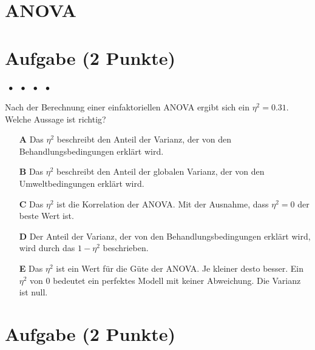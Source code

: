 \documentclass[a4paper, 9pt]{scrartcl}\usepackage[]{graphicx}\usepackage[]{xcolor}
\begin{document}
\section*{ANOVA}

\section{Aufgabe \hfill (2 Punkte)}

\ifcollection
\begin{flushright}
\tiny\vspace{-2Ex}
\textbf{\examinhaltstart}
\exammodulemathstat $\;\bullet$
\exammodulestat $\;\bullet$
\exammodulestatbbv $\;\bullet$
\exammodulestatversuch $\;\bullet$
\exammodulebiostat
\vspace{-1Ex}
\end{flushright}
\fi






Nach der Berechnung einer einfaktoriellen ANOVA ergibt sich ein $\eta^2 = 0.31$. Welche Aussage ist richtig?



\begin{enumerate}
\item [\textbf{A} \msquare] Das $\eta^2$ beschreibt den Anteil der Varianz, der von den Behandlungsbedingungen erklärt wird.
\item [\textbf{B} \msquare] Das $\eta^2$ beschreibt den Anteil der globalen Varianz, der von den Umweltbedingungen erklärt wird.
\item [\textbf{C} \msquare] Das $\eta^2$ ist die Korrelation der ANOVA. Mit der Ausnahme, dass $\eta^2 = 0$ der beste Wert ist.
\item [\textbf{D} \msquare] Der Anteil der Varianz, der von den Behandlungsbedingungen erklärt wird, wird durch das $1-\eta^2$ beschrieben.
\item [\textbf{E} \msquare] Das $\eta^2$ ist ein Wert für die Güte der ANOVA. Je kleiner desto besser. Ein $\eta^2$ von 0 bedeutet ein perfektes Modell mit keiner Abweichung. Die Varianz ist null.
\end{enumerate}

\section{Aufgabe \hfill (2 Punkte)}
\end{document}
